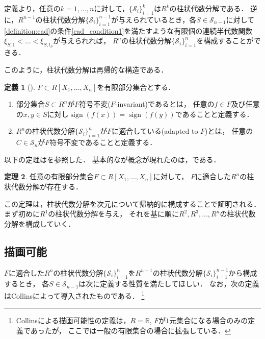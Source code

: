 \documentclass[uplatex, dvipdfmx]{jsarticle}
\numberwithin{equation}{section}
\newcommand{\R}{\mathbb{R}}
\DeclareMathOperator{\sign}{sign}
\theoremstyle{definition}
\newtheorem{definition}{定義}[section]
\newtheorem{theorem}[definition]{定理}
\begin{document}
定義より，任意の$k=1, \dots, n$に対して，$\{\mathcal{S}_i\}_{i=1}^k$は$R^k$の柱状代数分解である．
逆に，$R^{n-1}$の柱状代数分解$\{\mathcal{S}_i\}_{i=1}^{n-1}$が与えられているとき，各$S \in \mathcal{S}_{n-1}$に対して
\cref{definition:cad}の条件\ref{cad_condition1}を満たすような有限個の連続半代数関数$\xi_{S,1}<\dots<\xi_{S,l_S}$が与えられれば，
$R^n$の柱状代数分解$\{\mathcal{S}_i\}_{i=1}^n$を構成することができる．

このように，柱状代数分解は再帰的な構造である．

\begin{definition}[{\cite[Definition 5.5.]{MR2248869}}]
     $F \subset R[X_1, \dots, X_n]$を有限部分集合とする．
     \begin{enumerate}
          \item 部分集合$S \subset R^n$が$F$符号不変($F$-invariant)であるとは，
          任意の$f \in F$及び任意の$x,y \in S$に対し$\sign(f(x))=\sign(f(y))$であることと定義する．

          \item $R^n$の柱状代数分解$\{\mathcal{S}_i\}_{i=1}^n$が$F$に適合している(adapted to $F$)とは，
          任意の$C \in \mathcal{S}_n$が$F$符号不変であることと定義する．
     \end{enumerate}
\end{definition}

以下の定理は\cite[Theorem 5.6]{MR2248869}を参照した．
基本的なが概念が現れたのは，\cite{MR0403962}である．
\begin{theorem} \label{theorem:cad}
     任意の有限部分集合$F \subset R[X_1, \dots, X_n]$に対して，
     $F$に適合した$R^n$の柱状代数分解が存在する．
\end{theorem}

この定理は，柱状代数分解を次元について帰納的に構成することで証明される．
まず初めに$R^1$の柱状代数分解を与え，
それを基に順に$R^2, R^3, \dots, R^n$の柱状代数分解を構成していく．

\subsection{描画可能}
$F$に適合した$R^n$の柱状代数分解$\{\mathcal{S}_i\}_{i=1}^n$を$R^{n-1}$の柱状代数分解$\{\mathcal{S}_i\}_{i=1}^{n-1}$から構成するとき，
各$S \in \mathcal{S}_{n-1}$は次に定義する性質を満たしてほしい．
なお，次の定義はCollins\cite{MR0403962}によって導入されたものである．
\footnote{
     Collins\cite{MR0403962}による描画可能性の定義は，$R=\R$, $F$が$1$元集合になる場合のみの定義であったが，
     ここでは一般の有限集合の場合に拡張している．
}
\end{document}
